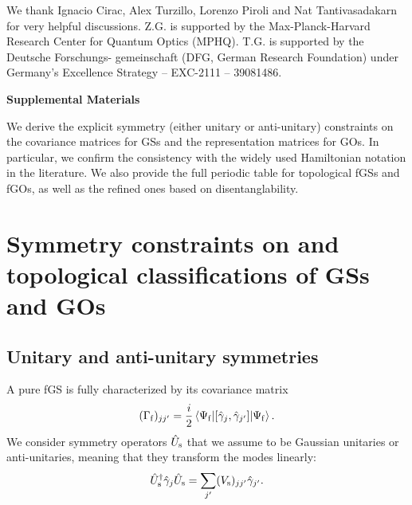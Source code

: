 \documentclass[prl,twocolumn,preprintnumbers,superscriptaddress,amsmath,amssymb]{revtex4-1}
\begin{document}
We thank Ignacio Cirac, Alex Turzillo, Lorenzo Piroli and Nat Tantivasadakarn for very helpful discussions. Z.G. is supported by the Max-Planck-Harvard Research Center for Quantum Optics (MPHQ). T.G. is supported by the Deutsche Forschungs- gemeinschaft (DFG, German Research Foundation) under Germany’s Excellence Strategy – EXC-2111 – 39081486. 




\clearpage
\begin{center}
\textbf{\large Supplemental Materials}
\end{center}
\setcounter{equation}{0}
\setcounter{figure}{0}
\setcounter{table}{0}
\makeatletter
\renewcommand{\theequation}{S\arabic{equation}}
\renewcommand{\thefigure}{S\arabic{figure}}
\renewcommand{\bibnumfmt}[1]{[S#1]}

We derive the explicit symmetry (either unitary or anti-unitary) constraints on the covariance matrices for GSs and the representation matrices for GOs. In particular, we confirm the consistency with the widely used Hamiltonian notation in the literature. We also provide the full periodic table for topological fGSs and fGOs, as well as the refined ones based on disentanglability. 




\section{Symmetry constraints on and topological classifications of GSs and GOs}

\subsection{Unitary and anti-unitary symmetries}
A pure fGS is fully characterized by its covariance matrix
\begin{equation}
(\Gamma_{\rm f})_{jj'} = \frac{i}{2} \braket{\Psi_{\rm f}| [\hat\gamma_j,\hat\gamma_{j'}] |\Psi_{\rm f}} .
\end{equation}
We consider symmetry operators $\hat U_{\rm s}$ that we assume to be Gaussian unitaries or anti-unitaries, meaning that they transform the modes linearly:
\begin{equation}
\hat U_{\rm s}^\dag \hat{\gamma}_j \hat U_{\rm s} = \sum_{j'} (V_{\rm s})_{jj'} \hat{\gamma}_{j'} .
\end{equation}
\end{document}
